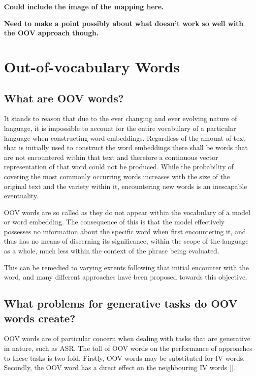 \documentclass[12pt, a4paper]{report}
\theoremstyle{definition}
\theoremstyle{definition}%
\theoremstyle{definition}%
\theoremstyle{definition}%
\theoremstyle{definition}%
\theoremstyle{definition}%
\renewcommand{\cite}[1]{[\citealp{#1}]}
\begin{document}
\textbf{Could include the image of the mapping here. }

\textbf{Need to make a point possibly about what doesn't work so well with the OOV approach though.}

\section{Out-of-vocabulary Words}
\subsection{What are OOV words?}

It stands to reason that due to the ever changing and ever evolving nature of language, it is impossible to account for the entire vocabulary of a particular language when constructing word embeddings. Regardless of the amount of text that is initially used to construct the word embeddings there shall be words that are not encountered within that text and therefore a continuous vector representation of that word could not be produced. While the probability of covering the most commonly occurring words increases with the size of the original text and the variety within it, encountering new words is an inescapable eventuality. 

OOV words are so called as they do not appear within the vocabulary of a model or word embedding. The consequence of this is that the model effectively possesses no information about the specific word when first encountering it, and thus has no means of discerning its significance, within the scope of the language as a whole, much less within the context of the phrase being evaluated. 

This can be remedied to varying extents following that initial encounter with the word, and many different approaches have been proposed towards this objective.

\subsection{What problems for generative tasks do OOV words create?}

OOV words are of particular concern when dealing with tasks that are generative in nature, such as ASR. The toll of OOV words on the performance of approaches to these tasks is two-fold. Firstly, OOV words may be substituted for IV words. Secondly, the OOV word has a direct effect on the neighbouring IV words \cite{naptali2012}.
\end{document}
